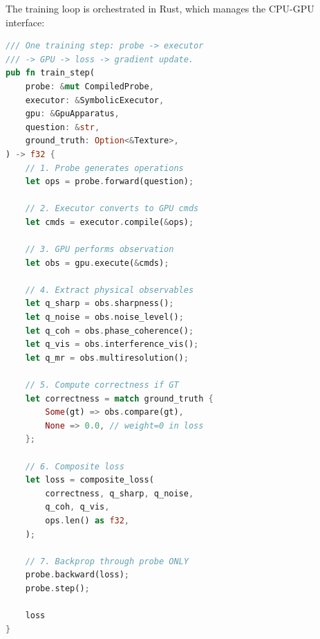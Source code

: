 \documentclass[11pt,twocolumn,a4paper]{article}
\theoremstyle{definition}
\theoremstyle{remark}
\begin{document}
The training loop is orchestrated in Rust, which manages the CPU-GPU interface:

\begin{lstlisting}[language=Rust,caption={Training loop orchestrator (Rust)},label=lst:rust_training]
/// One training step: probe -> executor
/// -> GPU -> loss -> gradient update.
pub fn train_step(
    probe: &mut CompiledProbe,
    executor: &SymbolicExecutor,
    gpu: &GpuApparatus,
    question: &str,
    ground_truth: Option<&Texture>,
) -> f32 {
    // 1. Probe generates operations
    let ops = probe.forward(question);

    // 2. Executor converts to GPU cmds
    let cmds = executor.compile(&ops);

    // 3. GPU performs observation
    let obs = gpu.execute(&cmds);

    // 4. Extract physical observables
    let q_sharp = obs.sharpness();
    let q_noise = obs.noise_level();
    let q_coh = obs.phase_coherence();
    let q_vis = obs.interference_vis();
    let q_mr = obs.multiresolution();

    // 5. Compute correctness if GT
    let correctness = match ground_truth {
        Some(gt) => obs.compare(gt),
        None => 0.0, // weight=0 in loss
    };

    // 6. Composite loss
    let loss = composite_loss(
        correctness, q_sharp, q_noise,
        q_coh, q_vis,
        ops.len() as f32,
    );

    // 7. Backprop through probe ONLY
    probe.backward(loss);
    probe.step();

    loss
}
\end{lstlisting}
\end{document}

